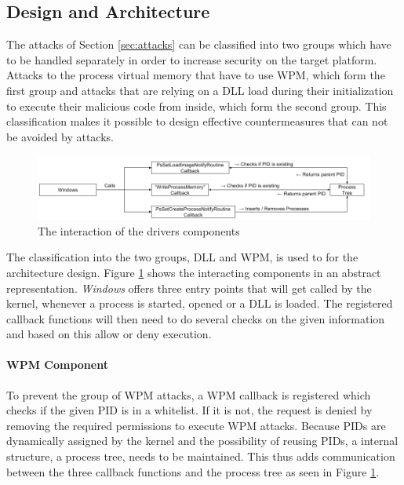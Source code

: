 \subsection{Design and Architecture}
The attacks of Section \ref{sec:attacks} can be classified into two groups which have to be handled separately in order to increase security on the target platform. Attacks to the process virtual memory that have to use \gls{WPM}, which form the first group and attacks that are relying on a \gls{DLL} load during their initialization to execute their malicious code from inside, which form the second group. This classification makes it possible to design effective countermeasures that can not be avoided by attacks.

\begin{figure}[!htbp]
\centering
\includegraphics[angle=90,scale=0.6]{sections/implementation/interaction.png}
\caption{The interaction of the drivers components}
\label{fig:interaction}
\end{figure}

The classification into the two groups, \gls{DLL} and \gls{WPM}, is used to for the architecture design. Figure \ref{fig:interaction} shows the interacting components in an abstract representation. \emph{Windows} offers three entry points that will get called by the kernel, whenever a process is started, opened or a \gls{DLL} is loaded. The registered callback functions will then need to do several checks on the given information and based on this allow or deny execution. 
\paragraph{WPM Component}
To prevent the group of \gls{WPM} attacks, a WPM callback is registered which checks if the given \gls{PID} is in a whitelist. If it is not, the request is denied by removing the required permissions to execute \gls{WPM} attacks. Because \glspl{PID} are dynamically assigned by the kernel and the possibility of reusing \glspl{PID}, a internal structure, a process tree, needs to be maintained. This thus adds communication between the three callback functions and the process tree as seen in Figure \ref{fig:interaction}. 
